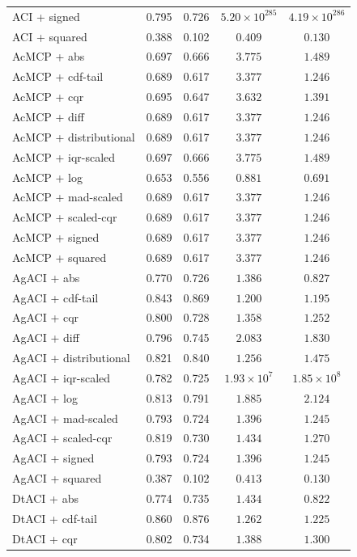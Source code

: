 \begin{longtable}{lcccc}
	ACI + signed & 0.795 & 0.726 & $5.20 \times 10^{285}$ & $4.19 \times 10^{286}$ \\
	ACI + squared & 0.388 & 0.102 & $0.409$ & $0.130$ \\
	AcMCP + abs & 0.697 & 0.666 & $3.775$ & $1.489$ \\
	AcMCP + cdf-tail & 0.689 & 0.617 & $3.377$ & $1.246$ \\
	AcMCP + cqr & 0.695 & 0.647 & $3.632$ & $1.391$ \\
	AcMCP + diff & 0.689 & 0.617 & $3.377$ & $1.246$ \\
	AcMCP + distributional & 0.689 & 0.617 & $3.377$ & $1.246$ \\
	AcMCP + iqr-scaled & 0.697 & 0.666 & $3.775$ & $1.489$ \\
	AcMCP + log & 0.653 & 0.556 & $0.881$ & $0.691$ \\
	AcMCP + mad-scaled & 0.689 & 0.617 & $3.377$ & $1.246$ \\
	AcMCP + scaled-cqr & 0.689 & 0.617 & $3.377$ & $1.246$ \\
	AcMCP + signed & 0.689 & 0.617 & $3.377$ & $1.246$ \\
	AcMCP + squared & 0.689 & 0.617 & $3.377$ & $1.246$ \\
	AgACI + abs & 0.770 & 0.726 & $1.386$ & $0.827$ \\
	AgACI + cdf-tail & 0.843 & 0.869 & $1.200$ & $1.195$ \\
	AgACI + cqr & 0.800 & 0.728 & $1.358$ & $1.252$ \\
	AgACI + diff & 0.796 & 0.745 & $2.083$ & $1.830$ \\
	AgACI + distributional & 0.821 & 0.840 & $1.256$ & $1.475$ \\
	AgACI + iqr-scaled & 0.782 & 0.725 & $1.93 \times 10^{7}$ & $1.85 \times 10^{8}$ \\
	AgACI + log & 0.813 & 0.791 & $1.885$ & $2.124$ \\
	AgACI + mad-scaled & 0.793 & 0.724 & $1.396$ & $1.245$ \\
	AgACI + scaled-cqr & 0.819 & 0.730 & $1.434$ & $1.270$ \\
	AgACI + signed & 0.793 & 0.724 & $1.396$ & $1.245$ \\
	AgACI + squared & 0.387 & 0.102 & $0.413$ & $0.130$ \\
	DtACI + abs & 0.774 & 0.735 & $1.434$ & $0.822$ \\
	DtACI + cdf-tail & 0.860 & 0.876 & $1.262$ & $1.225$ \\
	DtACI + cqr & 0.802 & 0.734 & $1.388$ & $1.300$ \\

\end{longtable}
